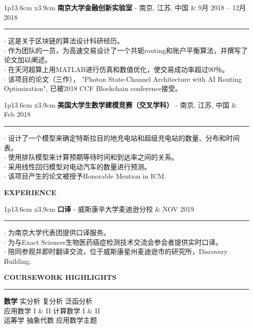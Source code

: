\documentclass[UTF8,A4]{ctexart}
\newcommand{\cvsection}[1]
{
	\begin{center}
		\large\textcolor{sectcol}{\textbf{#1}}
	\end{center}
}
\newcommand{\cvevent}[3]
{

\begin{tabular*}{1\textwidth}{p{13.6cm}  x{3.9cm}}
	\textbf{#2} - \textcolor{bgcol}{#3} &   \vspace{2.5pt}\textcolor{sectcol}{#1}
\end{tabular*}

\vspace{-8pt}
\textcolor{softcol}{\hrule}
\vspace{6pt}


}
\begin{document}
\cvevent{9月 2018 – 12月 2018}
        {南京大学金融创新实验室}
        {南京, 江苏, 中国}

        $\cdot$ 这是关于区块链的算法设计科研经历。\\
        $\cdot$ 作为团队的一员，为高速交易设计了一个共轭routing和账户平衡算法，并撰写了论文加以阐述。\\
        $\cdot$ 在天河超算上用MATLAB进行仿真和数值优化，使交易成功率超过90％。\\
        $\cdot$ 该项目的论文（三作）， 
                "Photon State-Channel Architecture with AI Routing Optimization", 
                已被2018 CCF Blockchain conference接受。\\

\cvevent{Feb 2018}
        {美国大学生数学建模竞赛（交叉学科）}
        {南京, 江苏, 中国}

        $\cdot$ 设计了一个模型来确定特斯拉目的地充电站和超级充电站的数量、分布和时间表。\\
        $\cdot$ 使用排队模型来计算预期等待时间和到达率之间的关系。\\
        $\cdot$ 采用线性回归模型对电动汽车的数量进行预测。\\
        $\cdot$ 该项目产生的论文被授予Honorable Mention in ICM.\\



\cvsection{EXPERIENCE}
\cvevent{NOV 2019}
        {口译}
        {威斯康辛大学麦迪逊分校}

        $\cdot$ 为南京大学代表团提供口译服务。\\
        $\cdot$ 为与Exact Sciences生物医药癌症检测技术交流会参会者提供实时口译。\\
        $\cdot$ 陪同参观并即时翻译交流，位于威斯康星州麦迪逊市的研究所，Discovery Building.\\


\newpage


\cvsection{COURSEWORK HIGHLIGHTS}
\vspace{-18pt}
\textcolor{softcol}{\hrule}
\vspace{6pt}

\textbf{数学}
实分析 \textbullet{} 复分析 \textbullet{} 泛函分析 \\
应用数学 I \& II \textbullet{} 计算数学 I \& II \\
运筹学 \textbullet{} 抽象代数 \textbullet{} 应用数学主题\\
\end{document}
